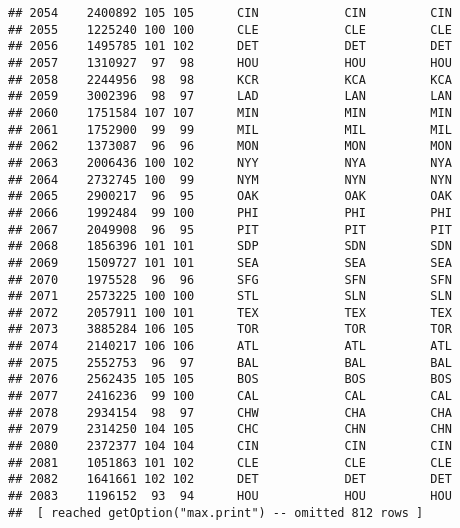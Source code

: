 \documentclass[]{article}
\newenvironment{Shaded}{\begin{snugshade}}{\end{snugshade}}
\newcommand{\KeywordTok}[1]{\textcolor[rgb]{0.13,0.29,0.53}{\textbf{#1}}}
\newcommand{\DataTypeTok}[1]{\textcolor[rgb]{0.13,0.29,0.53}{#1}}
\newcommand{\DecValTok}[1]{\textcolor[rgb]{0.00,0.00,0.81}{#1}}
\newcommand{\StringTok}[1]{\textcolor[rgb]{0.31,0.60,0.02}{#1}}
\newcommand{\OperatorTok}[1]{\textcolor[rgb]{0.81,0.36,0.00}{\textbf{#1}}}
\newcommand{\NormalTok}[1]{#1}
\begin{document}
\begin{verbatim}
## 2054    2400892 105 105      CIN            CIN         CIN
## 2055    1225240 100 100      CLE            CLE         CLE
## 2056    1495785 101 102      DET            DET         DET
## 2057    1310927  97  98      HOU            HOU         HOU
## 2058    2244956  98  98      KCR            KCA         KCA
## 2059    3002396  98  97      LAD            LAN         LAN
## 2060    1751584 107 107      MIN            MIN         MIN
## 2061    1752900  99  99      MIL            MIL         MIL
## 2062    1373087  96  96      MON            MON         MON
## 2063    2006436 100 102      NYY            NYA         NYA
## 2064    2732745 100  99      NYM            NYN         NYN
## 2065    2900217  96  95      OAK            OAK         OAK
## 2066    1992484  99 100      PHI            PHI         PHI
## 2067    2049908  96  95      PIT            PIT         PIT
## 2068    1856396 101 101      SDP            SDN         SDN
## 2069    1509727 101 101      SEA            SEA         SEA
## 2070    1975528  96  96      SFG            SFN         SFN
## 2071    2573225 100 100      STL            SLN         SLN
## 2072    2057911 100 101      TEX            TEX         TEX
## 2073    3885284 106 105      TOR            TOR         TOR
## 2074    2140217 106 106      ATL            ATL         ATL
## 2075    2552753  96  97      BAL            BAL         BAL
## 2076    2562435 105 105      BOS            BOS         BOS
## 2077    2416236  99 100      CAL            CAL         CAL
## 2078    2934154  98  97      CHW            CHA         CHA
## 2079    2314250 104 105      CHC            CHN         CHN
## 2080    2372377 104 104      CIN            CIN         CIN
## 2081    1051863 101 102      CLE            CLE         CLE
## 2082    1641661 102 102      DET            DET         DET
## 2083    1196152  93  94      HOU            HOU         HOU
##  [ reached getOption("max.print") -- omitted 812 rows ]
\end{verbatim}

\begin{Shaded}
\end{Shaded}
\end{document}
